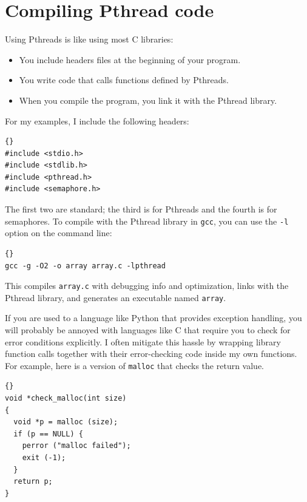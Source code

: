 \documentclass{book}
\begin{document}
\section{Compiling Pthread code}

Using Pthreads is like using most C libraries:

\begin{itemize}

\item You include headers files at the beginning of your
program.

\item You write code that calls functions defined by Pthreads.

\item When you compile the program, you link it with the
Pthread library.

\end{itemize}

For my examples, I include the following headers:

\begin{lstlisting}[title={Headers}]{}
#include <stdio.h>
#include <stdlib.h>
#include <pthread.h>
#include <semaphore.h>
\end{lstlisting}

The first two are standard; the third is for Pthreads and
the fourth is for semaphores.
To compile with the Pthread library in {\tt gcc}, you
can use the {\tt -l}
option on the command line:

\begin{lstlisting}[title={}]{}
gcc -g -O2 -o array array.c -lpthread
\end{lstlisting}

This compiles {\tt array.c} with debugging info and optimization,
links with the Pthread library, and generates an executable
named {\tt array}.

If you are used to a language like Python that provides exception
handling, you will probably be annoyed with languages like C that
require you to check for error conditions explicitly.  I often
mitigate this hassle by wrapping library function calls
together with their error-checking code inside my own functions.
For example, here is a version of {\tt malloc}
that checks the return value.

\begin{lstlisting}[title={}]{}
void *check_malloc(int size)
{
  void *p = malloc (size);
  if (p == NULL) {
    perror ("malloc failed");
    exit (-1);
  }
  return p;
}
\end{lstlisting}
\end{document}
